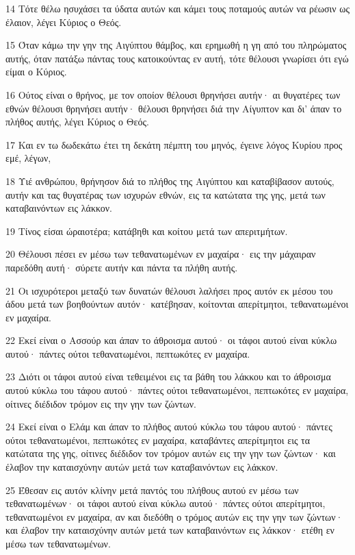 \par 14 Τότε θέλω ησυχάσει τα ύδατα αυτών και κάμει τους ποταμούς αυτών να ρέωσιν ως έλαιον, λέγει Κύριος ο Θεός.
\par 15 Όταν κάμω την γην της Αιγύπτου θάμβος, και ερημωθή η γη από του πληρώματος αυτής, όταν πατάξω πάντας τους κατοικούντας εν αυτή, τότε θέλουσι γνωρίσει ότι εγώ είμαι ο Κύριος.
\par 16 Ούτος είναι ο θρήνος, με τον οποίον θέλουσι θρηνήσει αυτήν· αι θυγατέρες των εθνών θέλουσι θρηνήσει αυτήν· θέλουσι θρηνήσει διά την Αίγυπτον και δι' άπαν το πλήθος αυτής, λέγει Κύριος ο Θεός.
\par 17 Και εν τω δωδεκάτω έτει τη δεκάτη πέμπτη του μηνός, έγεινε λόγος Κυρίου προς εμέ, λέγων,
\par 18 Υιέ ανθρώπου, θρήνησον διά το πλήθος της Αιγύπτου και καταβίβασον αυτούς, αυτήν και τας θυγατέρας των ισχυρών εθνών, εις τα κατώτατα της γης, μετά των καταβαινόντων εις λάκκον.
\par 19 Τίνος είσαι ώραιοτέρα; κατάβηθι και κοίτου μετά των απεριτμήτων.
\par 20 Θέλουσι πέσει εν μέσω των τεθανατωμένων εν μαχαίρα· εις την μάχαιραν παρεδόθη αυτή· σύρετε αυτήν και πάντα τα πλήθη αυτής.
\par 21 Οι ισχυρότεροι μεταξύ των δυνατών θέλουσι λαλήσει προς αυτόν εκ μέσου του άδου μετά των βοηθούντων αυτόν· κατέβησαν, κοίτονται απερίτμητοι, τεθανατωμένοι εν μαχαίρα.
\par 22 Εκεί είναι ο Ασσούρ και άπαν το άθροισμα αυτού· οι τάφοι αυτού είναι κύκλω αυτού· πάντες ούτοι τεθανατωμένοι, πεπτωκότες εν μαχαίρα.
\par 23 Διότι οι τάφοι αυτού είναι τεθειμένοι εις τα βάθη του λάκκου και το άθροισμα αυτού κύκλω του τάφου αυτού· πάντες ούτοι τεθανατωμένοι, πεπτωκότες εν μαχαίρα, οίτινες διέδιδον τρόμον εις την γην των ζώντων.
\par 24 Εκεί είναι ο Ελάμ και άπαν το πλήθος αυτού κύκλω του τάφου αυτού· πάντες ούτοι τεθανατωμένοι, πεπτωκότες εν μαχαίρα, καταβάντες απερίτμητοι εις τα κατώτατα της γης, οίτινες διέδιδον τον τρόμον αυτών εις την γην των ζώντων· και έλαβον την καταισχύνην αυτών μετά των καταβαινόντων εις λάκκον.
\par 25 Έθεσαν εις αυτόν κλίνην μετά παντός του πλήθους αυτού εν μέσω των τεθανατωμένων· οι τάφοι αυτού είναι κύκλω αυτού· πάντες ούτοι απερίτμητοι, τεθανατωμένοι εν μαχαίρα, αν και διεδόθη ο τρόμος αυτών εις την γην των ζώντων· και έλαβον την καταισχύνην αυτών μετά των καταβαινόντων εις λάκκον· ετέθη εν μέσω των τεθανατωμένων.
